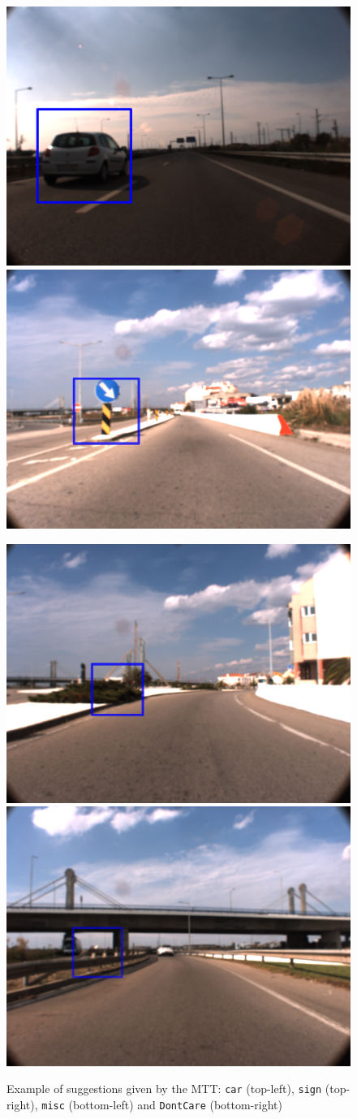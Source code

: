 \begin{figure}[htp]
	
	\centering
	
	\includegraphics[width=.49\textwidth]{capresults/imgs/car1.png}
	\includegraphics[width=.49\textwidth]{capresults/imgs/sign1.png}
	
	\includegraphics[width=.49\textwidth]{capresults/imgs/misc1.png}
	\includegraphics[width=.49\textwidth]{capresults/imgs/dontcare1.png}
	
	\caption{Example of suggestions given by the MTT:  \texttt{car} (top-left), \texttt{sign} (top-right), \texttt{misc} (bottom-left) and \texttt{DontCare} (bottom-right)}
	\label{fig:dataset1results1}
	
\end{figure}

